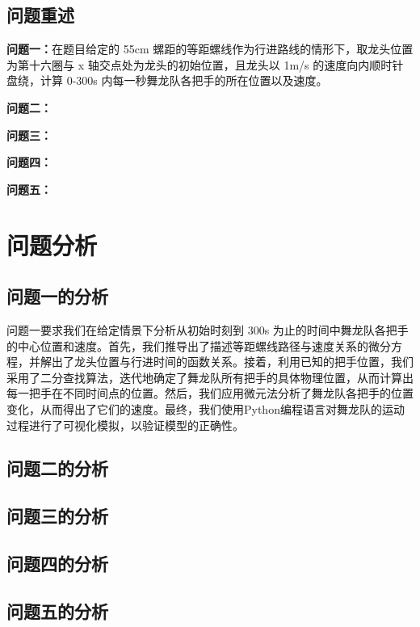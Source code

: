 \documentclass[a4paper]{article}
\begin{document}
	
	\subsection{问题重述}
		\textbf{问题一：}在题目给定的 55cm 螺距的等距螺线作为行进路线的情形下，取龙头位置为第十六圈与 x 轴交点处为龙头的初始位置，且龙头以 1m/s 的速度向内顺时针盘绕，计算 0-300s 内每一秒舞龙队各把手的所在位置以及速度。
		
		\textbf{问题二：}
		
		\textbf{问题三：}
		
		\textbf{问题四：}
		
		\textbf{问题五：}
	
	\section{问题分析}
	\subsection{问题一的分析}
	问题一要求我们在给定情景下分析从初始时刻到 300s 为止的时间中舞龙队各把手的中心位置和速度。首先，我们推导出了描述等距螺线路径与速度关系的微分方程，并解出了龙头位置与行进时间的函数关系。接着，利用已知的把手位置，我们采用了二分查找算法，迭代地确定了舞龙队所有把手的具体物理位置，从而计算出每一把手在不同时间点的位置。然后，我们应用微元法分析了舞龙队各把手的位置变化，从而得出了它们的速度。最终，我们使用Python编程语言对舞龙队的运动过程进行了可视化模拟，以验证模型的正确性。
	\subsection{问题二的分析}
	\subsection{问题三的分析}
	\subsection{问题四的分析}
	\subsection{问题五的分析}
	
\end{document}
